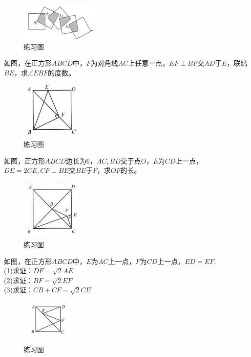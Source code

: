 \documentclass{ecnuthesis}
\begin{document}
\begin{figure}[H]
\centering
\includegraphics[width=4cm]{picture/6112.png}
\caption{练习图}
\end{figure}
\begin{problem}
    如图，在正方形$ABCD$中，$F$为对角线$AC$上任意一点，$EF\perp BF$交$AD$于$E$，联结$BE$，求$\angle EBF$的度数。\\
\end{problem}
\begin{figure}[H]
\centering
\includegraphics[width=3cm]{picture/645.png}
\caption{练习图}
\end{figure}
\begin{problem}
    如图，正方形$ABCD$边长为6，$AC,BD$交于点$O$，$E$为$CD$上一点，$DE=2CE,CF\perp BE$交$BE$于$F$，求$OF$的长。
\end{problem}
\begin{figure}[H]
\centering
\includegraphics[width=3cm]{picture/6110.png}
\caption{练习图}
\end{figure}
\begin{problem}
    如图，在正方形$ABCD$中，$E$为$AC$上一点，$F$为$CD$上一点，$ED=EF$. \\
    (1)求证：$DF=\sqrt2 AE$ \\
    (2)求证：$BF=\sqrt2 EF$ \\
    (3)求证：$CB+CF=\sqrt2 CE$ \\
\end{problem}
\begin{figure}[H]
\centering
\includegraphics[width=3cm]{picture/6111.png}
\caption{练习图}
\end{figure}
\clearpage
\end{document}
